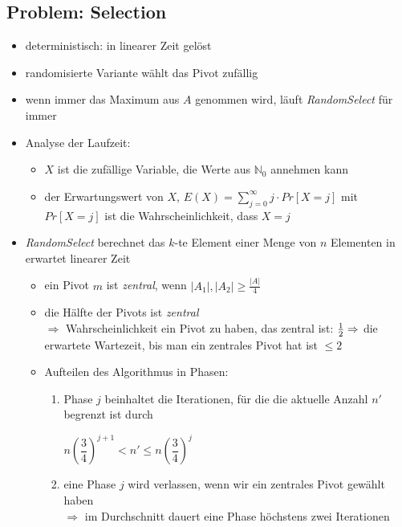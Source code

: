 \vspace*{-0.75\baselineskip}\subsection*{Problem: Selection}
\vspace*{-0.5\baselineskip}\begin{itemize}[itemsep=-1pt]
	\item deterministisch: in linearer Zeit gelöst
	\item randomisierte Variante wählt das Pivot zufällig
	\item wenn immer das Maximum aus $A$ genommen wird, läuft \textit{RandomSelect} für immer
	\item Analyse der Laufzeit:
		\begin{itemize}[itemsep=-1pt]
			\item $X$ ist die zufällige Variable, die Werte aus $\mathbb{N}_0$ annehmen kann
			\item der Erwartungswert von $X$, $E(X)=\sum\limits_{j=0}^{\infty}j\cdot Pr[X=j]$ mit $Pr[X=j]$ ist die Wahrscheinlichkeit, dass $X=j$
		\end{itemize}
	\item \textit{RandomSelect} berechnet das $k$-te Element einer Menge von $n$ Elementen in erwartet linearer Zeit
		\vspace*{-1.5\baselineskip}\Proof\up
			\begin{itemize}
				\item ein Pivot $m$ ist \textit{zentral}, wenn $|A_1|,|A_2| \geq \frac{|A|}{4}$
				\item die Hälfte der Pivots ist \textit{zentral}\\
				$\Rightarrow$ Wahrscheinlichkeit ein Pivot zu haben, das zentral ist: $\frac{1}{2}\\
				\Rightarrow$ die erwartete Wartezeit, bis man ein zentrales Pivot hat ist $\leq 2$
				\item Aufteilen des Algorithmus in Phasen:
					\begin{enumerate}
						\item Phase $j$ beinhaltet die Iterationen, für die die aktuelle Anzahl $n'$ begrenzt ist durch
							\begin{center}
								$n\left(\dfrac{3}{4}\right)^{j+1}< n' \leq n\left(\dfrac{3}{4}\right)^j$
							\end{center}
						\item eine Phase $j$ wird verlassen, wenn wir ein zentrales Pivot gewählt haben\\
						$\Rightarrow$ im Durchschnitt dauert eine Phase höchstens zwei Iterationen
						\setcounter{temp}{\value{enumi}}
					\end{enumerate}
			\end{itemize}
\end{itemize}
